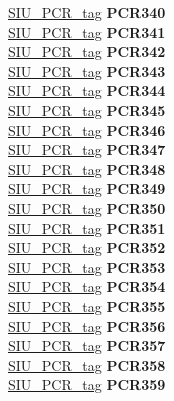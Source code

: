 \begin{DoxyCompactItemize}
\begin{tabbing}
\>\>\mbox{\hyperlink{unionSIU__tag_1_1SIU__PCR__tag}{SIU\_PCR\_tag}} {\bfseries PCR340}\\
\>\>\mbox{\hyperlink{unionSIU__tag_1_1SIU__PCR__tag}{SIU\_PCR\_tag}} {\bfseries PCR341}\\
\>\>\mbox{\hyperlink{unionSIU__tag_1_1SIU__PCR__tag}{SIU\_PCR\_tag}} {\bfseries PCR342}\\
\>\>\mbox{\hyperlink{unionSIU__tag_1_1SIU__PCR__tag}{SIU\_PCR\_tag}} {\bfseries PCR343}\\
\>\>\mbox{\hyperlink{unionSIU__tag_1_1SIU__PCR__tag}{SIU\_PCR\_tag}} {\bfseries PCR344}\\
\>\>\mbox{\hyperlink{unionSIU__tag_1_1SIU__PCR__tag}{SIU\_PCR\_tag}} {\bfseries PCR345}\\
\>\>\mbox{\hyperlink{unionSIU__tag_1_1SIU__PCR__tag}{SIU\_PCR\_tag}} {\bfseries PCR346}\\
\>\>\mbox{\hyperlink{unionSIU__tag_1_1SIU__PCR__tag}{SIU\_PCR\_tag}} {\bfseries PCR347}\\
\>\>\mbox{\hyperlink{unionSIU__tag_1_1SIU__PCR__tag}{SIU\_PCR\_tag}} {\bfseries PCR348}\\
\>\>\mbox{\hyperlink{unionSIU__tag_1_1SIU__PCR__tag}{SIU\_PCR\_tag}} {\bfseries PCR349}\\
\>\>\mbox{\hyperlink{unionSIU__tag_1_1SIU__PCR__tag}{SIU\_PCR\_tag}} {\bfseries PCR350}\\
\>\>\mbox{\hyperlink{unionSIU__tag_1_1SIU__PCR__tag}{SIU\_PCR\_tag}} {\bfseries PCR351}\\
\>\>\mbox{\hyperlink{unionSIU__tag_1_1SIU__PCR__tag}{SIU\_PCR\_tag}} {\bfseries PCR352}\\
\>\>\mbox{\hyperlink{unionSIU__tag_1_1SIU__PCR__tag}{SIU\_PCR\_tag}} {\bfseries PCR353}\\
\>\>\mbox{\hyperlink{unionSIU__tag_1_1SIU__PCR__tag}{SIU\_PCR\_tag}} {\bfseries PCR354}\\
\>\>\mbox{\hyperlink{unionSIU__tag_1_1SIU__PCR__tag}{SIU\_PCR\_tag}} {\bfseries PCR355}\\
\>\>\mbox{\hyperlink{unionSIU__tag_1_1SIU__PCR__tag}{SIU\_PCR\_tag}} {\bfseries PCR356}\\
\>\>\mbox{\hyperlink{unionSIU__tag_1_1SIU__PCR__tag}{SIU\_PCR\_tag}} {\bfseries PCR357}\\
\>\>\mbox{\hyperlink{unionSIU__tag_1_1SIU__PCR__tag}{SIU\_PCR\_tag}} {\bfseries PCR358}\\
\>\>\mbox{\hyperlink{unionSIU__tag_1_1SIU__PCR__tag}{SIU\_PCR\_tag}} {\bfseries PCR359}\\

\end{tabbing}
\end{DoxyCompactItemize}
